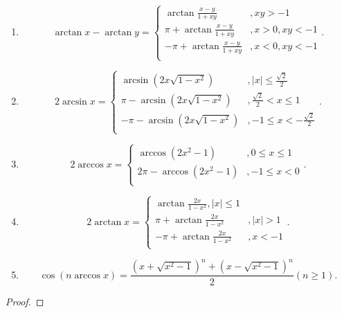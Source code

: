 \documentclass[../../main.tex]{subfiles}%
\begin{document}
\begin{theorem}[常用反三角函数性质]
\begin{enumerate}
\item $$\arctan x-\arctan y=\begin{cases}
\arctan \frac{x-y}{1+xy}&,xy>-1\\
\pi +\arctan \frac{x-y}{1+xy}&,x>0,xy<-1\\
-\pi +\arctan \frac{x-y}{1+xy}&,x<0,xy<-1\\
\end{cases}.$$

\item $$2\arcsin x=\begin{cases}
\arcsin \left( 2x\sqrt{1-x^2} \right) &,\left| x \right|\leqslant \frac{\sqrt{2}}{2}\\
\pi -\arcsin \left( 2x\sqrt{1-x^2} \right) &,\frac{\sqrt{2}}{2}<x\leqslant 1\\
-\pi -\arcsin \left( 2x\sqrt{1-x^2} \right) &,-1\leqslant x<-\frac{\sqrt{2}}{2}\\
\end{cases}.$$

\item $$2\arccos x=\begin{cases}
\arccos \left( 2x^2-1 \right) &,0\leqslant x\leqslant 1\\
2\pi -\arccos \left( 2x^2-1 \right) &,-1\leqslant x<0\\
\end{cases}.$$

\item $$2\arctan x=\begin{cases}
\arctan \frac{2x}{1-x^2},\left| x \right|\leqslant 1\\
\pi +\arctan \frac{2x}{1-x^2}&,\left| x \right|>1\\
-\pi +\arctan \frac{2x}{1-x^2}&,x<-1\\
\end{cases}.$$

\item $$\cos \left( n\arccos x \right) =\frac{\left( x+\sqrt{x^2-1} \right) ^n+\left( x-\sqrt{x^2-1} \right) ^n}{2}\left( n\geqslant 1 \right) .$$
\end{enumerate}
\end{theorem}
\begin{proof}



\end{proof}
\end{document}

